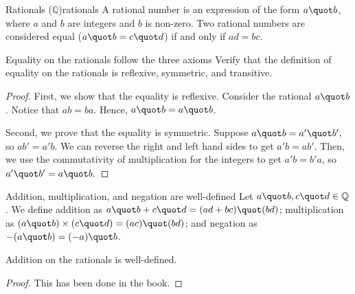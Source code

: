 \begin{definition}{Rationals ($\mathbb{Q}$)}{rationals}
    A rational number is an expression of the form $a \quot b$, where $a$ and $b$ are integers and $b$ is non-zero.
    Two rational numbers are considered equal ($a \quot b = c \quot d$) if and only if $ad = bc.$
\end{definition}

\begin{problem}{Equality on the rationals follow the three axioms}
	Verify that the definition of equality on the rationals is reflexive, symmetric, and transitive.
\end{problem}
\begin{proof}
    First, we show that the equality is reflexive. 
    Consider the rational $a \quot b$.
    Notice that $ab = ba$. 
    Hence, $a \quot b = a \quot b$.

    Second, we prove that the equality is symmetric. 
    Suppose $a \quot b = a' \quot b',$ so $ab' = a'b.$
    We can reverse the right and left hand sides to get $a'b = ab'$.
    Then, we use the commutativity of multiplication for the integers to get $a'b = b'a$, so $a' \quot b' = a \quot b.$
\end{proof}

\begin{problem}{Addition, multiplication, and negation are well-defined}
    Let $a \quot b, c \quot d \in \mathbb{Q}$. 
    We define addition as $a \quot b + c \quot d = (ad + bc) \quot (bd)$;
    multiplication as $(a \quot b) \times (c \quot d) = (ac) \quot (bd)$;
    and negation as $-(a \quot b)=(-a) \quot b$.
\end{problem}
\begin{proposition}
    Addition on the rationals is well-defined.
\end{proposition}
\begin{proof}
    This has been done in the book.
\end{proof}


